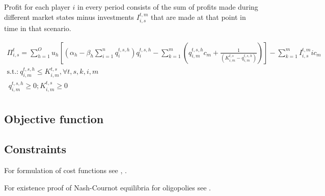Profit for each player $i$ in every period consists of the sum of profits made during different market states minus investments $I_{i,s}^{t,m}$ that are made at that point in time in that scenario.

\begin{gather}
	\Pi^t_{i,s} = \sum_{h=1}^O u_h \left[  (\alpha_h - \beta_h \sum_{i=1}^n q_i^{t,s,h}) q_i^{t,s,h} - \sum_{k=1}^{m} (q^{t,s,h}_{i,m} c_m + \frac{1}{(K^{t,s}_{i,m}-q^{t,s,h}_{i,m})}) \right] - \sum_{k=1}^{m} I_{i,s}^{t,m}  ic_m \\
\text{s.t.:} \  	q^{t,s,h}_{i,m} \leq K^{t,s}_{i,m}, \forall t,s,k,i,m \\
             \    q^{t,s,h}_{i,m} \geq 0; K^{t,s}_{i,m} \geq 0 \\
                  
\end{gather}




\subsection{Objective function}

\subsection{Constraints}

For formulation of cost functions see \cite{Bergman1995}, \cite{Pineau2003}.	

For existence proof of Nash-Cournot equilibria for oligopolies see \cite{Murphy1982}.



